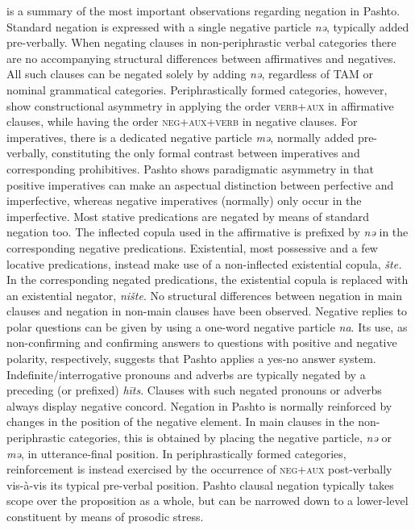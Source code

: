 \documentclass[output=paper,colorlinks,citecolor=brown]{langscibook}
\begin{document}
 is a summary of the most important observations regarding negation in Pashto.
Standard negation is expressed with a single negative particle \textit{nə}, typically added pre-verbally. When negating clauses in non-periphrastic verbal categories there are no accompanying structural differences between affirmatives and negatives. All such clauses can be negated solely by adding \textit{nə}, regardless of TAM or nominal grammatical categories. Periphrastically formed categories, however, show constructional asymmetry in applying the order \textsc{verb+aux} in affirmative clauses, while having the order \textsc{neg+aux+verb} in negative clauses. For imperatives, there is a dedicated negative particle \textit{mə}, normally added pre-verbally, constituting the only formal contrast between imperatives and corresponding prohibitives. Pashto shows paradigmatic asymmetry in that positive imperatives can make an aspectual distinction between perfective and imperfective, whereas negative imperatives (normally) only occur in the imperfective. Most stative predications are negated by means of standard negation too. The inflected copula used in the affirmative is prefixed by \textit{nə} in the corresponding negative predications. Existential, most possessive and a few locative predications, instead make use of a non-inflected existential copula, \textit{šte.} In the corresponding negated predications, the existential copula is replaced with an existential negator, \textit{nište}.
No structural differences between negation in main clauses and negation in non-main clauses have been observed. Negative replies to polar questions can be given by using a one-word negative particle \textit{na}. Its use, as non-confirming and confirming answers to questions with positive and negative polarity, respectively, suggests that Pashto applies a yes-no answer system. Indefinite/interrogative pronouns and adverbs are typically negated by a preceding (or prefixed) \textit{h\={i}ts}. Clauses with such negated pronouns or adverbs always display negative concord. Negation in Pashto is normally reinforced by changes in the position of the negative element. In main clauses in the non-periphrastic categories, this is obtained by placing the negative particle, \textit{nə} or \textit{mə}, in utterance-final position. In periphrastically formed categories, reinforcement is instead exercised by the occurrence of \textsc{neg+aux} post-verbally vis-à-vis its typical pre-verbal position. Pashto clausal negation typically takes scope over the proposition as a whole, but can be narrowed down to a lower-level constituent by means of prosodic stress.
\end{document}

